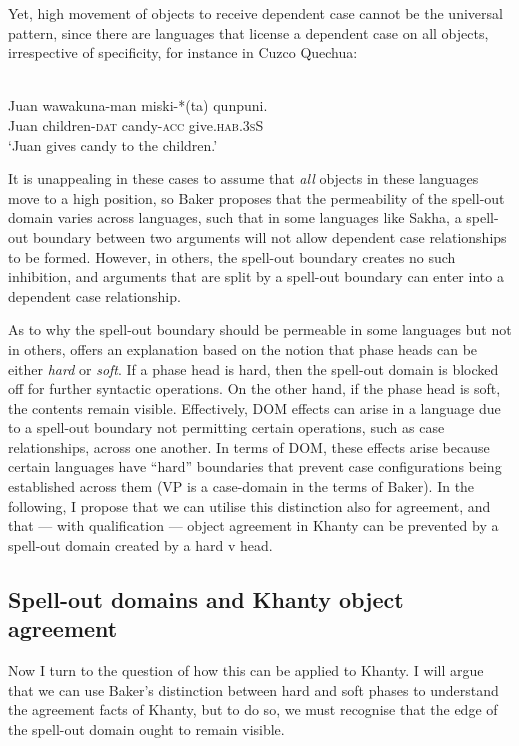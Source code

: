\documentclass[output=paper
,modfonts
,nonflat]{langsci/langscibook}
\begin{document}
\noindent Yet, high movement of objects to receive dependent case cannot be the universal pattern, since there are languages that license a dependent case on all objects, irrespective of specificity, for instance in Cuzco Quechua:

\begin{exe}
\ex {}\\
\gll Juan wawakuna-man miski-*(ta) qunpuni.\\
Juan children-\textsc{dat} candy-\textsc{acc} give.\textsc{hab.3sS}\\
\glt `Juan gives candy to the children.'
\end{exe}

\noindent It is unappealing in these cases to assume that \emph{all} objects in these languages move to a high position, so Baker proposes that the permeability of the spell-out domain varies across languages, such that in some languages like Sakha, a spell-out boundary between two arguments will not allow dependent case relationships to be formed.
However, in others, the spell-out boundary creates no such inhibition, and arguments that are split by a spell-out boundary can enter into a dependent case relationship.

As to why the spell-out boundary should be permeable in some languages but not in others, \citeauthor{Baker2015} offers an explanation based on the notion that phase heads can be either \emph{hard} or \emph{soft}.
If a phase head is hard, then the spell-out domain is blocked off for further syntactic operations.
On the other hand, if the phase head is soft, the contents remain visible.
Effectively, DOM effects can arise in a language due to a spell-out boundary not permitting certain operations, such as case relationships, across one another.
In terms of DOM, these effects arise because certain languages have ``hard'' boundaries that prevent case configurations being established across them (VP is a case-domain in the terms of Baker).
In the following, I propose that we can utilise this distinction also for agreement, and that --- with qualification --- object agreement in Khanty can be prevented by a spell-out domain created by a hard v head.


\subsection{Spell-out domains and Khanty object agreement}

Now I turn to the question of how this can be applied to Khanty.
I will argue that we can use Baker's distinction between hard and soft phases to understand the agreement facts of Khanty, but to do so, we must recognise that the edge of the spell-out domain ought to remain visible.
\end{document}
